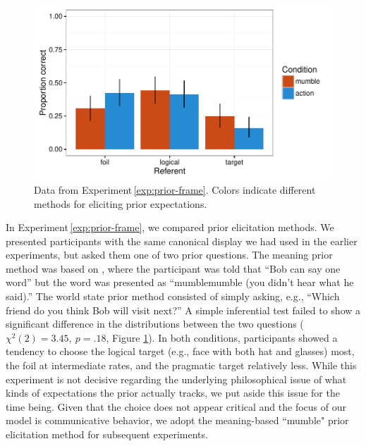 \documentclass[man,noapacite]{apa2}
\newcounter{Experiment}
\newcommand{\exptref}[1]{Experiment\,\ref{#1}}
\begin{document}
\begin{figure}[t]
  \centering
  \includegraphics[width=5in]{../plots/2-prior-frame.pdf}
  \caption{\label{fig:prior-frame} Data from \exptref{exp:prior-frame}. Colors indicate different methods for eliciting prior expectations.}
\end{figure}

In \exptref{exp:prior-frame}, we compared prior elicitation methods. We presented participants with the same canonical display we had used in the earlier experiments, but asked them one of two prior questions. The meaning prior method was based on , where the participant was told that ``Bob can say one word'' but the word was presented as ``mumblemumble (you didn't hear what he said).'' The world state prior method consisted of simply asking, e.g., ``Which friend do you think Bob will visit next?'' A simple inferential test failed to show a significant difference in the distributions between the two questions ($\chi^2(2) = 3.45,~p = .18$, Figure \ref{fig:prior-frame}). In both conditions, participants showed a tendency to choose the logical target (e.g., face with both hat and glasses) most, the foil at intermediate rates, and the pragmatic target relatively less. While this experiment is not decisive regarding the underlying philosophical issue of what kinds of expectations the prior actually tracks, we put aside this issue for the time being. Given that the choice does not appear critical and the focus of our model is communicative behavior, we  adopt the meaning-based ``mumble" prior elicitation method for subsequent experiments.
\end{document}
